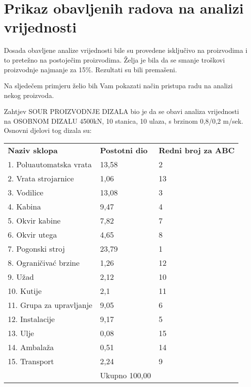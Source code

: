 \documentclass[a4paper,12pt]{article}
\numberwithin{figure}{section}
\begin{document}
\section*{Prikaz obavljenih radova na analizi vrijednosti}
Dosada obavljene analize vrijednosti bile su provedene isključivo na proizvodima i to pretežno na postoječim proizvodima. Želja je bila da se smanje troškovi proizvodnje najmanje za 15\%. Rezultati su bili premašeni.\par
Na sljedečem primjeru želio bih Vam pokazati način pristupa radu na analizi nekog proizvoda.\par
Zahtjev SOUR PROIZVODNJE DIZALA bio je da se obavi analiza vrijednosti na OSOBNOM DIZALU 4500kN, 10 stanica, 10 ulaza, s brzinom 0,8/0,2 m/sek. Osnovni djelovi tog dizala su:
\FloatBarrier
\begin{table}[h!]
\centering
\begin{tabular}{lll}
\textbf{Naziv sklopa}             & \textbf{Postotni dio}  & \textbf{Redni broj za ABC} \\
1. Poluautomatska vrata  & 13,58         & 2                 \\
2. Vrata strojarnice     & 1,06          & 13                \\
3. Vodilice              & 13,08         & 3                 \\
4. Kabina                & 9,47          & 4                 \\
5. Okvir kabine          & 7,82          & 7                 \\
6. Okvir utega           & 4,65          & 8                 \\
7. Pogonski stroj        & 23,79         & 1                 \\
8. Ograničivać brzine    & 1,26          & 12                \\
9. Užad                  & 2,12          & 10                \\
10. Kutije               & 2,1           & 11                \\
11. Grupa za upravljanje & 9,05          & 6                 \\
12. Instalacije          & 9,17          & 5                 \\
13. Ulje                 & 0,08          & 15                \\
14. Ambalaža             & 0,51          & 14                \\
15. Transport            & 2,24          & 9                 \\ \hline
                         & Ukupno 100,00 &                  
\end{tabular}
\end{table}
\end{document}
